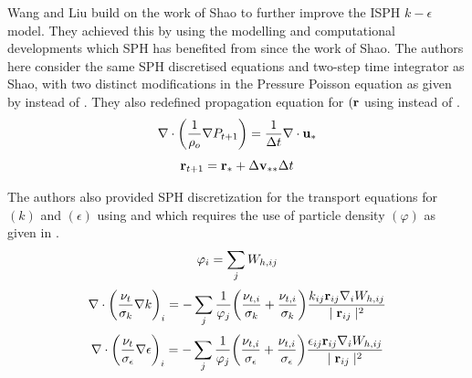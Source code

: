 Wang and Liu \parencite{Wang2020} build on the work of Shao \parencite{Shao2006} to further improve the ISPH $k-\epsilon$ model. They achieved this by using the modelling and computational developments which SPH has benefited from since the work of Shao.
The authors here consider the same SPH discretised equations and two-step time integrator as Shao, with two distinct modifications in the Pressure Poisson equation as given by  instead of . They also redefined propagation equation for $(\mathbf{r}$ using  instead of .
\begin{equation}
    \nabla \cdot \bigg( \frac{1}{\rho_o} \nabla P_{t+1} \bigg) = \frac{1}{\Delta t} \nabla \cdot \mathbf{u_*}
    \label{eq:Wang2020-correct-pressure-implicit}
\end{equation}
\begin{equation}
    \mathbf{r}_{t+1} = \mathbf{r}_* + \Delta \mathbf{v}_{**} \Delta t
    \label{eq:Wang2020-correct-end}
\end{equation}

The authors also provided SPH discretization for the transport equations for $(k)$ and $(\epsilon)$ using  and  which requires the use of particle density $(\varphi)$ as given in .
\begin{equation}
    \varphi_i = \sum_j W_{h, ij}
    \label{eq:Wang2020-particle-density}
\end{equation}
\begin{equation}
    \nabla \cdot \bigg( \frac{\nu_t}{\sigma_k} \nabla k \bigg)_i = - \sum_j \frac{1}{\varphi_j} \bigg( \frac{\nu_{t,i}}{\sigma_k} + \frac{\nu_{t,i}}{\sigma_k}  \bigg) \frac{k_{ij} \mathbf{r}_{ij} \nabla_{i} W_{h, ij}}{\mid \mathbf{r}_{ij} \mid^{2}}
    \label{eq:Wang2020-k-laplacian}
\end{equation}
\begin{equation}
    \nabla \cdot \bigg( \frac{\nu_t}{\sigma_{\epsilon}} \nabla \epsilon \bigg)_i = - \sum_j \frac{1}{\varphi_j} \bigg( \frac{\nu_{t,i}}{\sigma_{\epsilon}} + \frac{\nu_{t,i}}{\sigma_{\epsilon}}  \bigg) \frac{\epsilon_{ij} \mathbf{r}_{ij} \nabla_{i} W_{h, ij}}{\mid \mathbf{r}_{ij} \mid^{2}}
    \label{eq:Wang2020-eps-laplacian}
\end{equation}

